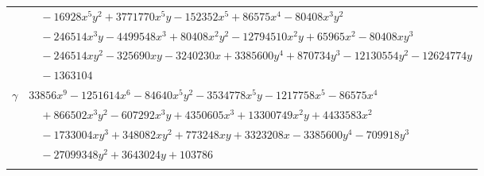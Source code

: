 \documentclass[11pt]{article}
\begin{document}
\begin{longtable}{@{}ll@{}}
 & $\quad -16928x^{5}y^{2}+3771770x^{5}y-152352x^{5}+86575x^{4}-80408x^{3}y^{2}$\\
 & $\quad -246514x^{3}y-4499548x^{3}+80408x^{2}y^{2}-12794510x^{2}y+65965x^{2}-80408xy^{3}$\\
 & $\quad -246514xy^{2}-325690xy-3240230x+3385600y^{4}+870734y^{3}-12130554y^{2}-12624774y$\\
 & $\quad -1363104$\\
$\gamma$ & $33856x^{9}-1251614x^{6}-84640x^{5}y^{2}-3534778x^{5}y-1217758x^{5}-86575x^{4}$\\
 & $\quad +866502x^{3}y^{2}-607292x^{3}y+4350605x^{3}+13300749x^{2}y+4433583x^{2}$\\
 & $\quad -1733004xy^{3}+348082xy^{2}+773248xy+3323208x-3385600y^{4}-709918y^{3}$\\
 & $\quad -27099348y^{2}+3643024y+103786$\\
\addlinespace[3pt]
\end{longtable}
\endgroup
\end{document}
